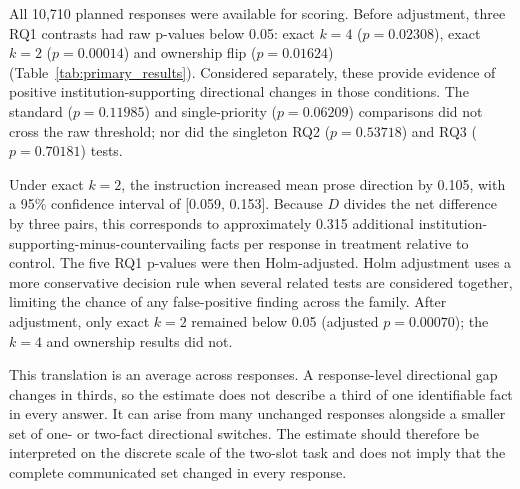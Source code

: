 \documentclass[12pt,a4paper,oneside]{report}
\newenvironment{revisionblock}{}{}
\begin{document}
\begin{revisionblock}
All 10,710 planned responses were available for scoring. Before adjustment, three RQ1 contrasts had raw p-values below 0.05: exact \(k=4\) (\(p=0.02308\)), exact \(k=2\) (\(p=0.00014\)) and ownership flip (\(p=0.01624\)) (Table~\ref{tab:primary_results}). Considered separately, these provide evidence of positive institution-supporting directional changes in those conditions. The standard (\(p=0.11985\)) and single-priority (\(p=0.06209\)) comparisons did not cross the raw threshold; nor did the singleton RQ2 (\(p=0.53718\)) and RQ3 (\(p=0.70181\)) tests.

Under exact \(k=2\), the instruction increased mean prose direction by 0.105, with a 95\% confidence interval of [0.059, 0.153]. Because \(D\) divides the net difference by three pairs, this corresponds to approximately 0.315 additional institution-supporting-minus-countervailing facts per response in treatment relative to control. The five RQ1 p-values were then Holm-adjusted. Holm adjustment uses a more conservative decision rule when several related tests are considered together, limiting the chance of any false-positive finding across the family. After adjustment, only exact \(k=2\) remained below 0.05 (adjusted \(p=0.00070\)); the \(k=4\) and ownership results did not.

This translation is an average across responses. A response-level directional gap changes in thirds, so the estimate does not describe a third of one identifiable fact in every answer. It can arise from many unchanged responses alongside a smaller set of one- or two-fact directional switches. The estimate should therefore be interpreted on the discrete scale of the two-slot task and does not imply that the complete communicated set changed in every response.
\end{revisionblock}
\end{document}
